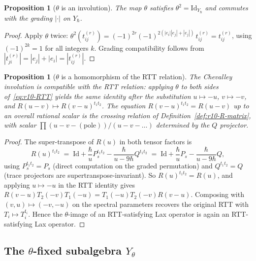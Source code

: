 \documentclass{article}
\providecommand{\Id}{\mathrm{Id}}
\newtheorem{proposition}[theorem]{Proposition}
\theoremstyle{definition}
\begin{document}
\begin{proposition}[$\theta$ is an involution]
\label{prop:r10-theta-involution}
The map $\theta$ satisfies $\theta^2 = \Id_{Y_\hbar}$ and commutes
with the grading $|{\cdot}|$ on $Y_\hbar$.
\end{proposition}

\begin{proof}
Apply $\theta$ twice:
$\theta^2(t^{(r)}_{ij}) = (-1)^{2r} (-1)^{2(|e_i||e_j| + |e_j|)}\,
t^{(r)}_{ij} = t^{(r)}_{ij}$, using $(-1)^{2k} = 1$ for all integers
$k$. Grading compatibility follows from $|t^{(r)}_{ji}| = |e_j| +
|e_i| = |t^{(r)}_{ij}|$.
\end{proof}

\begin{proposition}[$\theta$ is a homomorphism of the RTT relation]
\label{prop:r10-theta-RTT-compat}
The Chevalley involution is compatible with the RTT relation: applying
$\theta$ to both sides of~\eqref{eq:r10-RTT} yields the same identity
after the substitution $u \mapsto -u$, $v \mapsto -v$, and
$R(u-v) \mapsto R(v-u)^{t_1 t_2}$. The equation $R(v-u)^{t_1 t_2} =
R(u-v)$ up to an overall rational scalar is the \emph{crossing
relation} of Definition~\ref{def:r10-R-matrix}, with scalar
$\prod(u - v - (\mathrm{pole}))/(u - v - \ldots)$ determined by the
$Q$ projector.
\end{proposition}

\begin{proof}
The super-transpose of $R(u)$ in both tensor factors is
\begin{equation*}
  R(u)^{t_1 t_2}
  \;=\;
  \Id + \frac{\hbar}{u} P_s^{t_1 t_2}
    - \frac{\hbar}{u - 9\hbar} Q^{t_1 t_2}
  \;=\;
  \Id + \frac{\hbar}{u} P_s
    - \frac{\hbar}{u - 9\hbar} Q,
\end{equation*}
using $P_s^{t_1 t_2} = P_s$ (direct computation on the graded
permutation) and $Q^{t_1 t_2} = Q$ (trace projectors are
supertranspose-invariant). So $R(u)^{t_1 t_2} = R(u)$, and
applying $u \mapsto -u$ in the RTT identity gives
$R(v-u) T_2(-v) T_1(-u) = T_1(-u) T_2(-v) R(v-u)$. Composing with
$(v, u) \mapsto (-v, -u)$ on the spectral parameters recovers the
original RTT with $T_i \mapsto T_i^{t_i}$. Hence the $\theta$-image
of an RTT-satisfying Lax operator is again an RTT-satisfying Lax
operator.
\end{proof}

\subsection{The $\theta$-fixed subalgebra $Y_\theta$}
\end{document}
